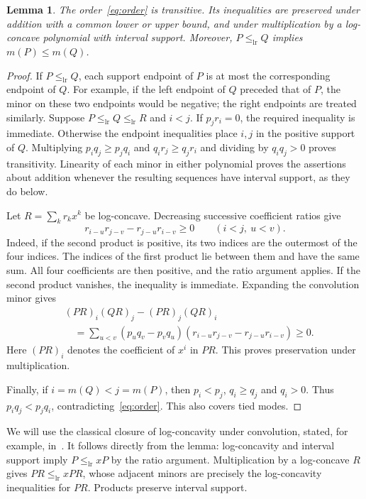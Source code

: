 \documentclass[11pt]{article}
\newtheorem{lemma}[theorem]{Lemma}
\newcommand{\lr}{\mathrel{\leq_{\mathrm{lr}}}}
\begin{document}
\begin{lemma}\label{lem:order}
The order~\eqref{eq:order} is transitive. Its inequalities are preserved
under addition with a common lower or upper bound, and under multiplication
by a log-concave polynomial with interval support. Moreover,
$P\lr Q$ implies $m(P)\leq m(Q)$.
\end{lemma}
\begin{proof}
If $P\lr Q$, each support endpoint of $P$ is at most the corresponding
endpoint of $Q$. For example, if the left endpoint of $Q$ preceded that
of $P$, the minor on these two endpoints would be negative; the right
endpoints are treated similarly. Suppose $P\lr Q\lr R$ and $i<j$.
If $p_jr_i=0$, the required inequality is immediate. Otherwise the
endpoint inequalities place $i,j$ in the positive support of $Q$.
Multiplying $p_iq_j\geq p_jq_i$ and $q_ir_j\geq q_jr_i$ and dividing
by $q_iq_j>0$ proves transitivity. Linearity of each minor in either
polynomial proves the assertions about addition whenever the resulting
sequences have interval support, as they do below.

Let $R=\sum_k r_kx^k$ be log-concave. Decreasing successive coefficient
ratios give
\begin{equation}\label{eq:toeplitz}
 r_{i-u}r_{j-v}-r_{j-u}r_{i-v}\geq0\qquad(i<j,\ u<v).
\end{equation}
Indeed, if the second product is positive, its two indices are the
outermost of the four indices. The indices of the first product lie
between them and have the same sum. All four coefficients are then
positive, and the ratio argument applies. If the second product vanishes,
the inequality is immediate. Expanding the convolution minor gives
\begin{equation}\label{eq:convolution}
 \begin{aligned}
 &(PR)_i(QR)_j-(PR)_j(QR)_i\\
 &\quad=\sum_{u<v}(p_uq_v-p_vq_u)
       (r_{i-u}r_{j-v}-r_{j-u}r_{i-v})\geq0.
 \end{aligned}
\end{equation}
Here $(PR)_i$ denotes the coefficient of $x^i$ in $PR$. This proves
preservation under multiplication.

Finally, if $i=m(Q)<j=m(P)$, then $p_i<p_j$, $q_i\geq q_j$ and
$q_i>0$. Thus $p_iq_j<p_jq_i$, contradicting~\eqref{eq:order}.
This also covers tied modes.
\end{proof}

We will use the classical closure of log-concavity under convolution,
stated, for example, in~\cite[Theorem 1.4]{JG}. It follows directly from
the lemma: log-concavity and interval support imply $P\lr xP$ by the
ratio argument. Multiplication by a log-concave $R$ gives
$PR\lr xPR$, whose adjacent minors are precisely the log-concavity
inequalities for $PR$. Products preserve interval support.
\end{document}
